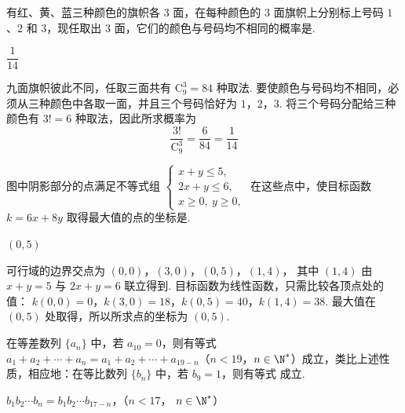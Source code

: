\begin{problem}
有红、黄、蓝三种颜色的旗帜各 \(3\) 面，在每种颜色的 \(3\) 面旗帜上分别标上号码 \(1\)、\(2\) 和 \(3\)，现任取出 \(3\) 面，它们的颜色与号码均不相同的概率是\fillinblank{}.
\end{problem}

\begin{answer}
\(\dfrac{1}{14}\)
\end{answer}

\begin{solution}
九面旗帜彼此不同，任取三面共有 \(\mathrm C_9^3=84\) 种取法. 要使颜色与号码均不相同，必须从三种颜色中各取一面，并且三个号码恰好为 \(1\)，\(2\)，\(3\). 将三个号码分配给三种颜色有 \(3!=6\) 种取法，因此所求概率为
\[
\frac{3!}{\mathrm C_9^3}=\frac{6}{84}=\frac1{14}
\]
\end{solution}

\begin{problem}
图中阴影部分的点满足不等式组 \(\begin{cases}
x+y\leqslant 5,\\
2x+y\leqslant 6,\\
x\geqslant 0,\ y\geqslant 0,
\end{cases}\) 在这些点中，使目标函数
\(k = 6x + 8y\) 取得最大值的点的坐标是\fillinblank{}.

\end{problem}

\begin{answer}
\((0,5)\)
\end{answer}

\begin{solution}
可行域的边界交点为 \((0,0)\)，\((3,0)\)，\((0,5)\)，\((1,4)\)，
其中 \((1,4)\) 由 \(x+y=5\) 与 \(2x+y=6\) 联立得到. 目标函数为线性函数，只需比较各顶点处的值：
\(k(0,0)=0\)，\(k(3,0)=18\)，\(k(0,5)=40\)，\(k(1,4)=38\).
最大值在 \((0,5)\) 处取得，所以所求点的坐标为 \((0,5)\).
\end{solution}

\begin{problem}
在等差数列 \(\{a_n\}\) 中，若 \(a_{10}=0\)，则有等式 \(a_1+a_2+\cdots+a_n=a_1+a_2+\cdots+a_{19-n}\)（\(n<19\)，\(n\in\N^{*}\)）成立，类比上述性质，相应地：在等比数列 \(\{b_n\}\) 中，若 \(b_9=1\)，则有等式\fillinblank{} 成立.
\end{problem}

\begin{answer}
\(b_1b_2\cdots b_n=b_1b_2\cdots b_{17-n}\)，（\(n<17\)，\(\ n\in\N^{*}\)）
\end{answer}

